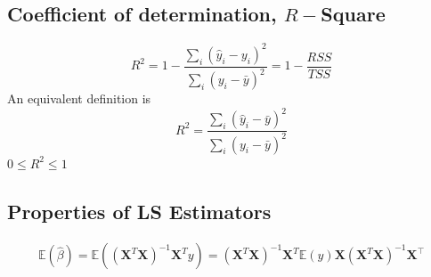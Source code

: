 \documentclass[11pt,a4paper]{article}
\begin{document}
\subsection{Coeﬃcient of determination, $R-$Square}
$$
R^{2}=1-\frac{\sum_{i}\left(\hat{y}_{i}-y_{i}\right)^{2}}{\sum_{i}\left(y_{i}-\bar{y}\right)^{2}}=1-\frac{R S S}{T S S}
$$
An equivalent definition is
$$
R^{2}=\frac{\sum_{i}\left(\hat{y}_{i}-\bar{y}\right)^{2}}{\sum_{i}\left(y_{i}-\bar{y}\right)^{2}}
$$
$0 \leq R^{2} \leq 1$

\subsection{Properties of LS Estimators}
\begin{equation}
    \begin{aligned}
        \mathbb{E}(\hat{\beta})=\mathbb{E}(\left(\mathbf{X}^{T} \mathbf{X}\right)^{-1} \mathbf{X}^{T} y)=\left(\mathbf{X}^{T} \mathbf{X}\right)^{-1} \mathbf{X}^{T} \mathbb{E}(y)
        \mathbf{X}\left(\mathbf{X}^{T} \mathbf{X}\right)^{-1} \mathbf{X}^{\top}
    \end{aligned}
    \nonumber
\end{equation}
\end{document}
